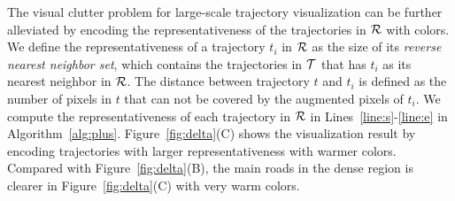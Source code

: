 



The visual clutter problem for large-scale trajectory visualization can be further alleviated by encoding the representativeness of the trajectories in $\mathcal{R}$ with colors.
We define the representativeness of a trajectory $t_i$ in $\mathcal{R}$ as the size of its \emph{reverse nearest neighbor set}, which contains the trajectories in $\mathcal{T}$ that has $t_i$ as its nearest neighbor in $\mathcal{R}$.
The distance between trajectory $t$ and $t_i$ is defined as the number of pixels in $t$ that can not be covered by the augmented pixels of $t_i$.
We compute the representativeness of each trajectory in $\mathcal{R}$ in Lines~\ref{line:s}-\ref{line:e} in Algorithm~\ref{alg:plus}.
Figure~\ref{fig:delta}(C) shows the visualization result by encoding trajectories with larger representativeness with warmer colors. Compared with Figure~\ref{fig:delta}(B), the main roads in the dense region is clearer in Figure~\ref{fig:delta}(C) with very warm colors.










